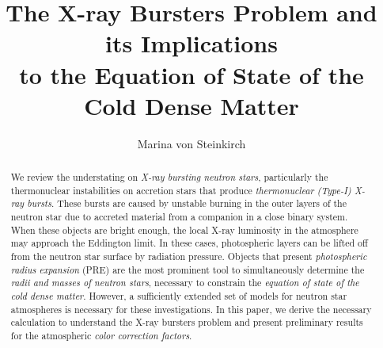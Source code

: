 \documentclass[12pt,preprint]{aastex}
\begin{document}
\title{The X-ray Bursters  Problem and its Implications \\to the Equation of State of the Cold Dense Matter}
    
\author{Marina von Steinkirch}



\begin{abstract}
We review the understating on {\it X-ray bursting neutron stars}, particularly the thermonuclear instabilities on accretion stars that produce {\it thermonuclear (Type-I) X-ray bursts}. These bursts are caused by unstable burning in the outer layers of the neutron star due to accreted material from a companion in a close binary system.  When these objects are bright enough, the local X-ray luminosity in the atmosphere may approach the Eddington limit. In these cases, photospheric layers can be lifted off from the neutron star surface by radiation pressure. Objects that present {\it photospheric radius expansion} (PRE) are the most prominent tool to simultaneously determine the {\it radii and masses of neutron stars}, necessary to constrain the {\it equation of state of the cold dense matter}. However, a sufficiently extended set of models for neutron star atmospheres is necessary for these investigations. In this paper, we derive the necessary calculation  to understand the X-ray bursters problem and present preliminary results  for the atmospheric {\it color correction factors}.
\end{abstract}



\maketitle
{} 
\tableofcontents 






\end{document}
